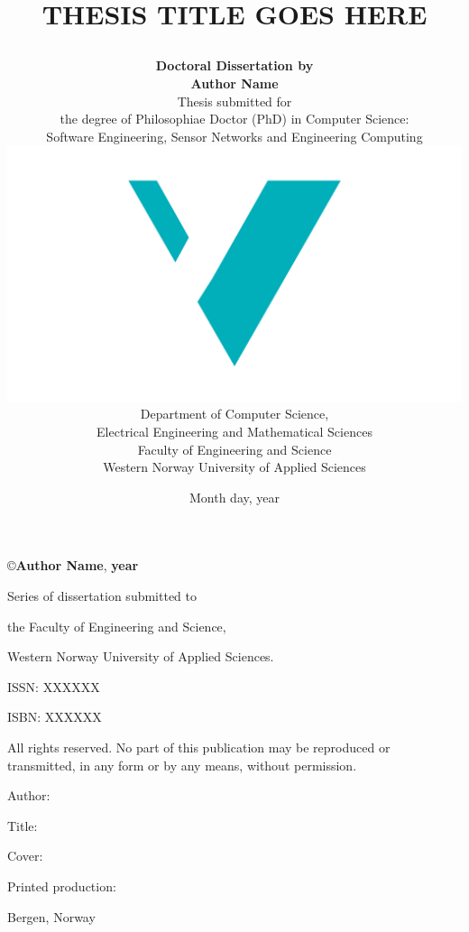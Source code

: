 \documentclass[12pt]{book} %
\title{
    {\fontsize{22}{24}\scshape{\color{Maroon}\MakeUppercase{Thesis Title Goes Here}}}
	\author{
        \textbf{Doctoral Dissertation by} \\ \textbf{Author Name}\vspace{1cm}\\
		Thesis submitted for \\ the degree of Philosophiae Doctor (PhD)
        in Computer Science: \\
        Software Engineering, Sensor Networks and Engineering
        Computing\vspace{1cm}\\
		\includegraphics[scale=0.36]{logos/logo.pdf}\vspace{2em}\\
        Department of Computer Science, \\ 
		Electrical Engineering and Mathematical Sciences \vspace{0.3cm}\\
		Faculty of Engineering and Science \vspace{0.3cm}\\
		Western Norway University of Applied Sciences
	}
	\date{Month day, year}
}
\begin{document}
\newcommand{\TextSize}{13}
\newcommand{\BaseLineSkip}{15}
\fontsize{\TextSize}{\BaseLineSkip}
\selectfont

\maketitle
\thispagestyle{empty}

\normalsize\vspace*{12cm}
\begin{minipage}{13cm}
\copyright{\textbf{Author Name}}, \textbf{year}\vspace{5ex}  %

Series of dissertation submitted to

the Faculty of Engineering and Science,

Western Norway University of Applied Sciences.\vspace{3ex}

ISSN: XXXXXX 			 %

ISBN: XXXXXX\vspace{3ex} %

All rights reserved. No part of this publication may be reproduced or
transmitted, in any form or by any means, without permission.\vspace{3ex}

Author: 

Title: \vspace{5ex}

Cover: 

Printed production: \vspace{3ex}

Bergen, Norway
\end{minipage}



\frontmatter



\tableofcontents
\end{document}
